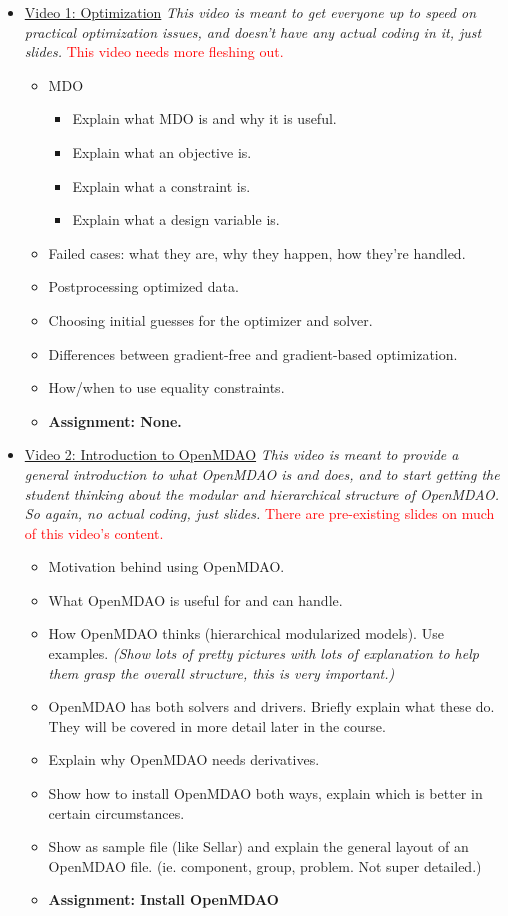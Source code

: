 \documentclass[12pt, letterpaper]{article}
\begin{document}
\begin{itemize}
	\item \underline{Video 1: Optimization} \textit{This video is meant to get everyone up to speed on practical optimization issues, and doesn't have any actual coding in it, just slides.} \textcolor{red}{This video needs more fleshing out.}
		\begin{itemize}
			\item MDO
				\begin{itemize}
					\item Explain what MDO is and why it is useful.
					\item Explain what an objective is.
					\item Explain what a constraint is.
					\item Explain what a design variable is.
				\end{itemize}
			\item Failed cases: what they are, why they happen, how they're handled.
			\item Postprocessing optimized data.
			\item Choosing initial guesses for the optimizer and solver.
			\item Differences between gradient-free and gradient-based optimization.
			\item How/when to use equality constraints.
			\item \textbf{Assignment: None.}
		\end{itemize}

	\item \underline{Video 2: Introduction to OpenMDAO} \textit{This video is meant to provide a general introduction to what OpenMDAO is and does, and to start getting the student thinking about the modular and hierarchical structure of OpenMDAO. So again, no actual coding, just slides.} \textcolor{red}{There are pre-existing slides on much of this video's content.}
		\begin{itemize}
			\item Motivation behind using OpenMDAO.
			\item What OpenMDAO is useful for and can handle.
			\item How OpenMDAO thinks (hierarchical modularized models). Use examples. \textit{(Show lots of pretty pictures with lots of explanation to help them grasp the overall structure, this is very important.)}
			\item OpenMDAO has both solvers and drivers. Briefly explain what these do. They will be covered in more detail later in the course.
			\item Explain why OpenMDAO needs derivatives.
			\item Show how to install OpenMDAO both ways, explain which is better in certain circumstances.
			\item Show as sample file (like Sellar) and explain the general layout of an OpenMDAO file. (ie. component, group, problem. Not super detailed.)
			\item \textbf{Assignment: Install OpenMDAO}
		\end{itemize}


\end{itemize}
\end{document}
